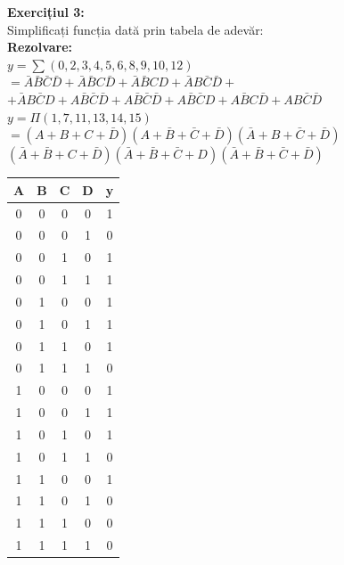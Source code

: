 \documentclass[12pt]{article}
\begin{document}
\begin{figure}[H]
    \begin{minipage}{0.7\textwidth}
        \textbf{Exercițiul 3:\\}
        Simplificați funcția dată prin tabela de adevăr:\\
        \textbf{Rezolvare:\\}
        $y=\sum(0,2,3,4,5,6,8,9,10,12)$\\
        $ = \bar{A}\bar{B}\bar{C}\bar{D}+\bar{A}\bar{B}C\bar{D}+\bar{A}\bar{B}CD+\bar{A}B\bar{C}\bar{D}+$\\
        $ + \bar{A}B\bar{C}D+A\bar{B}\bar{C}\bar{D}+A\bar{B}\bar{C}\bar{D}+A\bar{B}\bar{C}D+A\bar{B}C\bar{D}+AB\bar{C}\bar{D} $\\
        $y=\Pi(1,7,11,13,14,15)$\\
        $ =(A+B+C+\bar{D})(A+\bar{B}+\bar{C}+\bar{D})(\bar{A}+B+\bar{C}+\bar{D})$\\
        $ (\bar{A}+\bar{B}+C+\bar{D})(\bar{A}+\bar{B}+\bar{C}+D)(\bar{A}+\bar{B}+\bar{C}+\bar{D})$\\
    \end{minipage}
    \hfill
    \begin{minipage}{0.18\textwidth}
        \begin{tabular}{|c|c|c|c|c|}
            \hline
            A & B & C & D & y \\ \hline
            0 & 0 & 0 & 0 & 1 \\ \hline
            0 & 0 & 0 & 1 & 0 \\ \hline
            0 & 0 & 1 & 0 & 1 \\ \hline
            0 & 0 & 1 & 1 & 1 \\ \hline
            0 & 1 & 0 & 0 & 1 \\ \hline
            0 & 1 & 0 & 1 & 1 \\ \hline
            0 & 1 & 1 & 0 & 1 \\ \hline
            0 & 1 & 1 & 1 & 0 \\ \hline
            1 & 0 & 0 & 0 & 1 \\ \hline
            1 & 0 & 0 & 1 & 1 \\ \hline
            1 & 0 & 1 & 0 & 1 \\ \hline
            1 & 0 & 1 & 1 & 0 \\ \hline
            1 & 1 & 0 & 0 & 1 \\ \hline
            1 & 1 & 0 & 1 & 0 \\ \hline
            1 & 1 & 1 & 0 & 0 \\ \hline
            1 & 1 & 1 & 1 & 0 \\ \hline
        \end{tabular}
    \end{minipage}
\end{figure}
\end{document}
